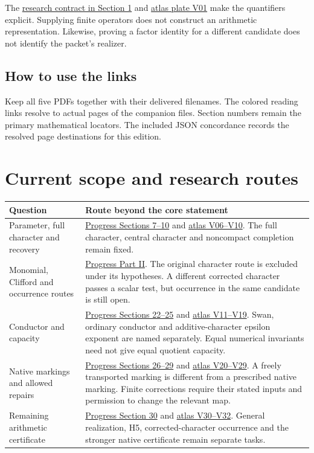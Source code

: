 The \href{https://komorebi.invalid/b06/contract}{research contract in Section 1} and \href{https://komorebi.invalid/b06/contract_atlas}{atlas plate V01} make the quantifiers explicit. Supplying finite operators does not construct an arithmetic representation. Likewise, proving a factor identity for a different candidate does not identify the packet's realizer.

\subsection*{How to use the links}
Keep all five PDFs together with their delivered filenames. The colored reading links resolve to actual pages of the companion files. Section numbers remain the primary mathematical locators. The included JSON concordance records the resolved page destinations for this edition.
\clearpage
\section*{Current scope and research routes}
{}
\begin{tabular}{@{}>{\raggedright\arraybackslash}p{.32\linewidth}>{\raggedright\arraybackslash}p{.63\linewidth}@{}}\toprule
Question & Route beyond the core statement\\\midrule
Parameter, full character and recovery & \href{https://komorebi.invalid/b06/arithmetic}{Progress Sections 7--10} and \href{https://komorebi.invalid/b06/arithmetic_atlas}{atlas V06--V10}. The full character, central character and noncompact completion remain fixed.\\[8pt]
Monomial, Clifford and occurrence routes & \href{https://komorebi.invalid/b06/monomial}{Progress Part II}. The original character route is excluded under its hypotheses. A different corrected character passes a scalar test, but occurrence in the same candidate is still open.\\[8pt]
Conductor and capacity & \href{https://komorebi.invalid/b06/conductor}{Progress Sections 22--25} and \href{https://komorebi.invalid/b06/conductor_atlas}{atlas V11--V19}. Swan, ordinary conductor and additive-character epsilon exponent are named separately. Equal numerical invariants need not give equal quotient capacity.\\[8pt]
Native markings and allowed repairs & \href{https://komorebi.invalid/b06/markings}{Progress Sections 26--29} and \href{https://komorebi.invalid/b06/markings_atlas}{atlas V20--V29}. A freely transported marking is different from a prescribed native marking. Finite corrections require their stated inputs and permission to change the relevant map.\\[8pt]
Remaining arithmetic certificate & \href{https://komorebi.invalid/b06/remaining}{Progress Section 30} and \href{https://komorebi.invalid/b06/remaining_atlas}{atlas V30--V32}. General realization, H5, corrected-character occurrence and the stronger native certificate remain separate tasks.\\\bottomrule
\end{tabular}

